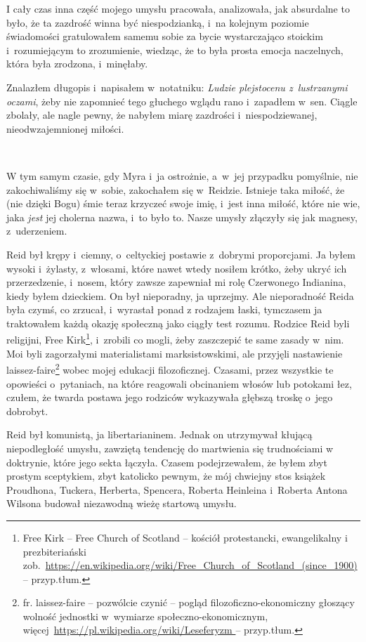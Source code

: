 \documentclass[oneside,polish,11pt,sfheadings]{mwbk}
\begin{document}
I cały czas inna część mojego umysłu pracowała, analizowała, jak
absurdalne to było, że ta zazdrość winna być niespodzianką, i~na
kolejnym poziomie świadomości gratulowałem samemu sobie za bycie
wystarczająco stoickim i~rozumiejącym to zrozumienie, wiedząc, że to
była prosta emocja naczelnych, która była zrodzona, i~minęłaby.

Znalazłem długopis i~napisałem w~notatniku: \emph{Ludzie plejstocenu z~lustrzanymi oczami}, żeby nie zapomnieć tego głuchego wglądu rano i~zapadłem w~sen. Ciągle zbolały, ale nagle pewny, że nabyłem miarę
zazdrości i~niespodziewanej, nieodwzajemnionej miłości.

~

W tym samym czasie, gdy Myra i~ja ostrożnie, a~w~jej przypadku
pomyślnie, nie zakochiwaliśmy się w~sobie, zakochałem się w~Reidzie.
Istnieje taka miłość, że (nie dzięki Bogu) śmie teraz krzyczeć swoje
imię, i~jest inna miłość, które nie wie, jaka \emph{jest }jej cholerna
nazwa, i~to było to. Nasze umysły złączyły się jak magnesy, z~uderzeniem.

Reid był krępy i~ciemny, o~celtyckiej postawie z~dobrymi proporcjami. Ja
byłem wysoki i~żylasty, z~włosami, które nawet wtedy nosiłem krótko,
żeby ukryć ich przerzedzenie, i~nosem, który zawsze zapewniał mi rolę
Czerwonego Indianina, kiedy byłem dzieckiem. On był nieporadny, ja
uprzejmy. Ale nieporadność Reida była czymś, co zrzucał, i~wyrastał ponad
z rodzajem łaski, tymczasem ja traktowałem każdą okazję społeczną jako
ciągły test rozumu. Rodzice Reid byli religijni, Free Kirk\footnote{ Free Kirk
-- Free Church of Scotland -- kościół protestancki, ewangelikalny i prezbiteriański zob.~\url{https://en.wikipedia.org/wiki/Free_Church_of_Scotland_(since_1900)} -- przyp.tłum.}, i~zrobili co mogli, żeby
zaszczepić te same zasady w~nim. Moi byli zagorzałymi materialistami
marksistowskimi, ale przyjęli nastawienie laissez-faire\footnote{ fr.
laissez-faire -- pozwólcie czynić -- pogląd filozoficzno-ekonomiczny
głoszący wolność jednostki w~wymiarze społeczno-ekonomicznym,
więcej~\url{https://pl.wikipedia.org/wiki/Leseferyzm } -- przyp.tłum.} wobec mojej edukacji filozoficznej. Czasami, przez wszystkie te
opowieści o~pytaniach, na które reagowali  obcinaniem włosów lub potokami łez,
czułem, że twarda postawa jego rodziców wykazywała głębszą troskę o~jego
dobrobyt.

Reid był komunistą, ja libertarianinem. Jednak on utrzymywał kłującą
niepodległość umysłu, zawziętą tendencję do martwienia się trudnościami
w doktrynie, które jego sekta łączyła. Czasem podejrzewałem, że byłem
zbyt prostym sceptykiem, zbyt katolicko pewnym, że mój chwiejny stos
książek Proudhona, Tuckera, Herberta, Spencera, Roberta Heinleina i~Roberta Antona Wilsona budował niezawodną wieżę startową umysłu.
\end{document}
